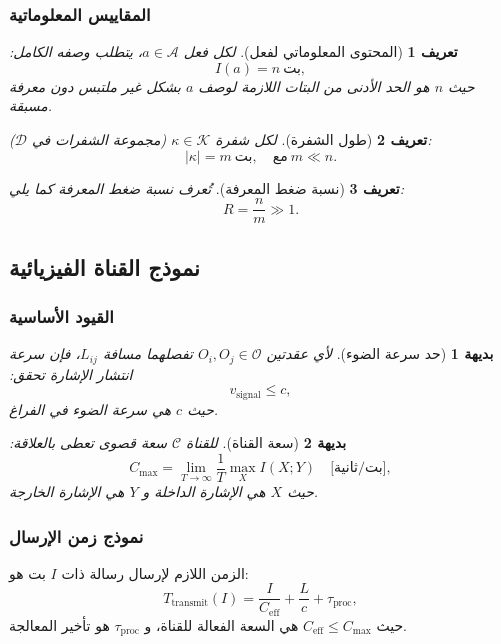 \documentclass[11pt,a4paper]{article}
\newtheorem{definition}{تعريف}
\newtheorem{axiom}{بديهة}
\begin{document}
	\subsubsection{المقاييس المعلوماتية}
	
	\begin{definition}[المحتوى المعلوماتي لفعل]
		لكل فعل $a \in \mathcal{A}$، يتطلب وصفه الكامل:
		\[
		I(a) = n \ \text{بت},
		\]
		حيث $n$ هو الحد الأدنى من البتات اللازمة لوصف $a$ بشكل غير ملتبس دون معرفة مسبقة.
	\end{definition}
	
	\begin{definition}[طول الشفرة]
		لكل شفرة $\kappa \in \mathcal{K}$ (مجموعة الشفرات في $\mathcal{D}$):
		\[
		|\kappa| = m \ \text{بت}, \quad \text{مع} \ m \ll n.
		\]
	\end{definition}
	
	\begin{definition}[نسبة ضغط المعرفة]
		تُعرف نسبة ضغط المعرفة كما يلي:
		\[
		R = \frac{n}{m} \gg 1.
		\]
	\end{definition}
	
	\subsection{نموذج القناة الفيزيائية}
	\label{app:channel-model}
	
	\subsubsection{القيود الأساسية}
	
	\begin{axiom}[حد سرعة الضوء]
		لأي عقدتين $O_i, O_j \in \mathcal{O}$ تفصلهما مسافة $L_{ij}$، فإن سرعة انتشار الإشارة تحقق:
		\[
		v_{\text{signal}} \leq c,
		\]
		حيث $c$ هي سرعة الضوء في الفراغ.
	\end{axiom}
	
	\begin{axiom}[سعة القناة]
		للقناة $\mathcal{C}$ سعة قصوى تعطى بالعلاقة:
		\[
		C_{\text{max}} = \lim_{T \to \infty} \frac{1}{T} \max_{X} I(X; Y) \quad \text{[بت/ثانية]},
		\]
		حيث $X$ هي الإشارة الداخلة و $Y$ هي الإشارة الخارجة.
	\end{axiom}
	
	\subsubsection{نموذج زمن الإرسال}
	
	الزمن اللازم لإرسال رسالة ذات $I$ بت هو:
	\[
	T_{\text{transmit}}(I) = \frac{I}{C_{\text{eff}}} + \frac{L}{c} + \tau_{\text{proc}},
	\]
	حيث $C_{\text{eff}} \leq C_{\text{max}}$ هي السعة الفعالة للقناة، و $\tau_{\text{proc}}$ هو تأخير المعالجة.
	
\end{document}
